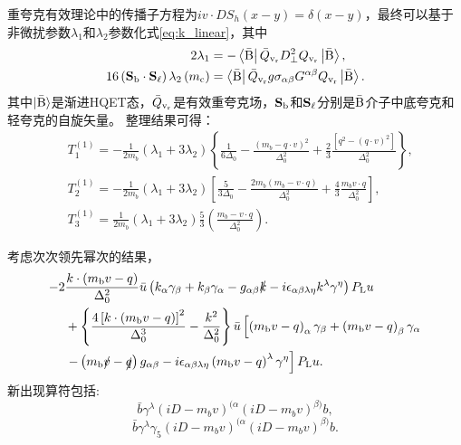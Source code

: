 重夸克有效理论中的传播子方程为$iv\cdot D S_{h}(x-y)=\delta(x-y)$，最终可以基于非微扰参数$\lambda_1$和$\lambda_2$参数化式\eqref{eq:k_linear}，其中
\begin{equation}
    \begin{aligned}
    2 \lambda_1 & =-\left\langle \mathrm{\bar{B}}\right| \bar{Q}_{\mathrm{v_r}} D_{\perp}^2 Q_{\mathrm{v_r}}\left|\mathrm{\bar{B}}\right\rangle, \\
    16\left(\mathbf{S}_{\mathrm{b}} \cdot \mathbf{S}_{\mathrm{\ell}}\right) \lambda_2\left(m_{\mathrm{c}}\right) & =\left\langle \mathrm{\bar{B}}\right| \bar{Q}_{\mathrm{v_r}} g \sigma_{\alpha \beta} G^{\alpha \beta} Q_{\mathrm{v_r}}\left|\mathrm{\bar{B}}\right\rangle .
    \end{aligned}
    \end{equation}
其中$\ket{\mathrm{\bar{B}}}$是渐进HQET态，$\bar{Q}_{\mathrm{v_r}}$是有效重夸克场，$\mathbf{S}_{\mathrm{b}}$和$\mathbf{S}_{\mathrm{\ell}}$分别是$\mathrm{\bar{B}}$介子中底夸克和轻夸克的自旋矢量。
整理结果可得：
\begin{equation}
    \begin{aligned}
    & T_1^{(1)}=-\frac{1}{2 m_b}\left(\lambda_1+3 \lambda_2\right)\left\{\frac{1}{6 \Delta_0}-\frac{\left(m_b-q \cdot v\right)^2}{\Delta_0^2}+\frac{2}{3} \frac{\left[q^2-(q \cdot v)^2\right]}{\Delta_0^2}\right\}, \\
    & T_2^{(1)}=-\frac{1}{2 m_b}\left(\lambda_1+3 \lambda_2\right)\left[\frac{5}{3 \Delta_0}-\frac{2 m_b\left(m_b-v \cdot q\right)}{\Delta_0^2}+\frac{4}{3} \frac{m_b v \cdot q}{\Delta_0^2}\right], \\
    & T_3^{(1)}=\frac{1}{2 m_b}\left(\lambda_1+3 \lambda_2\right) \frac{5}{3}\left(\frac{m_b-v \cdot q}{\Delta_0^2}\right) .
    \end{aligned}
    \end{equation}

考虑次次领先幂次的结果，
\begin{equation}
    \begin{aligned}
    -2 & \frac{k \cdot\left(m_{\mathrm{b}} v-q\right)}{\Delta_0^2} \bar{u}\left(k_\alpha \gamma_\beta+k_\beta \gamma_\alpha-g_{\alpha \beta}\slashed{k}-i \epsilon_{\alpha \beta \lambda \eta} k^\lambda \gamma^\eta\right) P_{\mathrm{L}} u \\
    & +\left\{\frac{4\left[k \cdot\left(m_{\mathrm{b}} v-q\right)\right]^2}{\Delta_0^3}-\frac{k^2}{\Delta_0^2}\right\} \bar{u}\left[\left(m_{\mathrm{b}} v-q\right)_\alpha \gamma_\beta+\left(m_{\mathrm{b}} v-q\right)_\beta \gamma_\alpha\right. \\
    & \left.-\left(m_{\mathrm{b}} \slashed{v}-\slashed{q}\right) g_{\alpha \beta}-i \epsilon_{\alpha \beta \lambda \eta}\left(m_{\mathrm{b}} v-q\right)^\lambda \gamma^\eta\right] P_{\mathrm{L}} u .
    \end{aligned}
\end{equation}
新出现算符包括:
$$\bar{b} \gamma^\lambda \left(i D-m_b v\right)^{(\alpha}\left(i D-m_b v\right)^{\beta)} b,$$
$$\bar{b} \gamma^\lambda \gamma_5\left(i D-m_b v\right)^{(\alpha}\left(i D-m_b v\right)^{\beta)} b.$$

